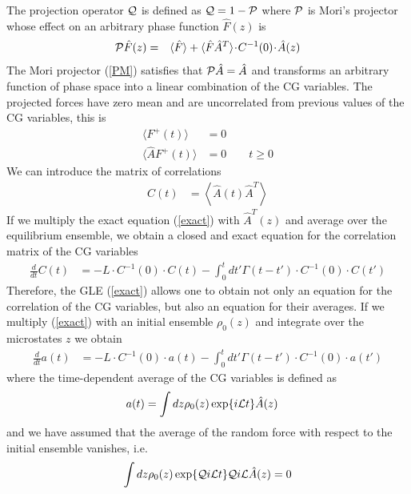 \documentclass[a4paper,openright,12pt]{book}
\newcommand{\esc}{\!\cdot\!}
\newcommand{\llangle}{\left\langle}
\newcommand{\rrangle}{\right\rangle}
\begin{document}
The projection operator ${\cal Q}$ is defined as ${\cal Q}=1-{\cal P}$
where  ${\cal P}$  is Mori's  projector whose  effect on  an arbitrary
phase function $\hat{F}(z)$ is
\begin{eqnarray}
  {\cal P}\hat{F}(z) &=& \langle \hat{F}\rangle+ \langle \hat{F}\hat{A}^T \rangle\esc  C^{-1}(0)\esc  \hat{A}(z)
\label{PM}
\end{eqnarray}
The  Mori  projector  (\ref{PM})   satisfies  that  ${\cal  P}\hat{A}=
\hat{A}$ and  transforms an arbitrary  function of phase space  into a
linear combination  of the  CG variables.   The projected  forces have
zero  mean  and  are  uncorrelated  from
previous values of the CG variables, this is 
\begin{align}
\langle  F^+  (t)\rangle&=0  
\nonumber\\
\langle \hat{A} F^+ (t)\rangle&=0 \quad\quad t\ge 0
\end{align}
We can introduce the matrix of correlations 
\begin{align}
  C(t)&=  \llangle \hat{A}(t)\hat{A}^T\rrangle
\end{align}
If we multiply the  exact equation (\ref{exact})  with $\hat{A}^T(z)$
and  average over  the equilibrium  ensemble, we  obtain a  closed and
exact equation for the correlation matrix of the CG variables
\begin{align}
  \frac{d}{dt}C(t)&=-L\esc C^{-1}(0)\esc C(t)
-\int_0^tdt' \Gamma(t-t')\esc C^{-1}(0)\esc  C(t')
\label{exactC}
\end{align}
Therefore, the GLE (\ref{exact}) allows  one to obtain not only an equation for the correlation of the CG variables, but also an equation for  their averages. 
If we multiply  (\ref{exact}) with an initial ensemble $\rho_0(z)$ and integrate over the microstates $z$ we obtain
\begin{align}
  \frac{d}{dt}a(t) &= -L\esc C^{-1}(0)\esc a(t)
  -\int_0^tdt' \Gamma(t-t')\esc  C^{-1}(0)\esc a(t')
\label{exactAve}
\end{align}
where the time-dependent average of the CG variables is defined as
\begin{align}
  a(t)&=\int dz \rho_0(z) \exp\{i{\cal L}t\}\hat{A}(z)
\end{align}
and we have assumed that the average of the random force with respect
to the initial ensemble vanishes, i.e.
\begin{align}
\int dz\rho_0(z)\exp\{{\cal Q}i{\cal L}t\} {\cal Q}i{\cal L}\hat{A}(z)=0
\label{F0}
\end{align}
\end{document}
